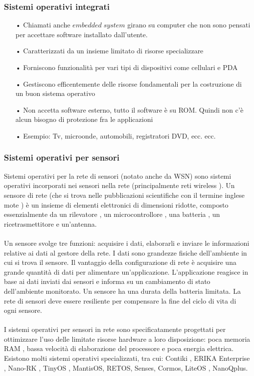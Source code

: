 \documentclass{article}
\begin{document}
\subsubsection{Sistemi operativi integrati}
\begin{enumerate}
   \item[•] Chiamati anche $embedded\;system$ girano su computer che non sono pensati per accettare software installato dall'utente.
   \item[•] Caratterizzati da un insieme limitato di risorse specializzare
   \item[•] Forniscono funzionalità per vari tipi di dispositivi come cellulari e PDA 
   \item[•] Gestiscono efficentemente delle risorse fondamentali per la costruzione di un buon sistema operativo 
   \item[•] Non accetta software esterno, tutto il software è su ROM. Quindi non c'è alcun bisogno di protezione fra le applicazioni
   \item[•] Esempio: Tv, microonde, automobili, registratori DVD, ecc. ecc.
\end{enumerate}

\subsubsection{Sistemi operativi per sensori}
Sistemi operativi per la rete di sensori (notato anche da WSN) sono sistemi operativi incorporati nei sensori nella rete (principalmente reti wireless ). Un sensore di rete (che si trova nelle pubblicazioni scientifiche con il termine inglese mote ) è un insieme di elementi elettronici di dimensioni ridotte, composto essenzialmente da un rilevatore , un microcontrollore , una batteria , un ricetrasmettitore e un'antenna.
\\\\Un sensore svolge tre funzioni: acquisire i dati, elaborarli e inviare le informazioni relative ai dati al gestore della rete. I dati sono grandezze fisiche dell'ambiente in cui si trova il sensore. Il vantaggio della configurazione di rete è acquisire una grande quantità di dati per alimentare un'applicazione. L'applicazione reagisce in base ai dati inviati dai sensori e informa su un cambiamento di stato dell'ambiente monitorato. Un sensore ha una durata della batteria limitata. La rete di sensori deve essere resiliente per compensare la fine del ciclo di vita di ogni sensore.
\\\\I sistemi operativi per sensori in rete sono specificatamente progettati per ottimizzare l'uso delle limitate risorse hardware a loro disposizione: poca memoria RAM , bassa velocità di elaborazione del processore e poca energia elettrica. Esistono molti sistemi operativi specializzati, tra cui: Contiki , ERIKA Enterprise , Nano-RK , TinyOS , MantisOS, RETOS, Senses, Cormos, LiteOS , NanoQplus.
\end{document}
